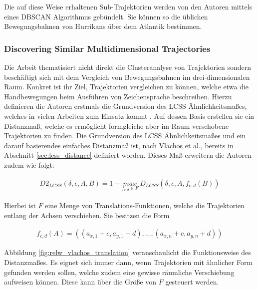 Die auf diese Weise erhaltenen Sub-Trajektorien werden von den Autoren mittels eines DBSCAN Algorithmus gebündelt.
Sie können so die üblichen Bewegungsbahnen von Hurrikans über dem Atlantik bestimmen.


\subsubsection*{Discovering Similar Multidimensional Trajectories}
Die Arbeit \cite[]{Vlachos2002} thematisiert nicht direkt die Clusteranalyse von Trajektorien sondern
beschäftigt sich mit dem Vergleich von Bewegungsbahnen im drei-dimensionalen Raum. Konkret ist ihr Ziel,
Trajektorien vergleichen zu können, welche etwa die Handbewegungen beim Ausführen von Zeichensprache beschreiben.
Hierzu definieren die Autoren erstmals die Grundversion des LCSS Ähnlichkeitsmaßes, welches in vielen Arbeiten zum Einsatz
kommt \cite[]{Atev2006, Buzan2004, Chen2005}. Auf dessen Basis erstellen sie ein Distanzmaß, welche es ermöglicht
formgleiche aber im Raum verschobene Trajektorien zu finden.
Die Grundversion des LCSS Ähnlichkeitsmaßes und ein darauf basierendes einfaches Distanzmaß ist, nach Vlachos et al.,
bereits in Abschnitt \ref{sec:lcss_distance} definiert worden.
Dieses Maß erweitern die Autoren zudem wie folgt:

\begin{ceqn}
\begin{align}
    D2_{LCSS}(\delta, \epsilon, A, B) = 1 - \underset{f_{c,d} \in F}{max}\ D_{LCSS}(\delta, \epsilon, A, f_{c,d}(B))
\end{align}
\end{ceqn}

Hierbei ist $F$ eine Menge von Translations-Funktionen, welche die Trajektorien entlang der Achsen verschieben.
Sie besitzen die Form

\begin{ceqn}
\begin{align}
    f_{c, d}(A) = ((a_{x, 1} + c, a_{y, 1} + d), ..., (a_{x, n} + c, a_{y, n} + d))
\end{align}
\end{ceqn}

Abbildung \ref{fig:relw_vlachos_translation} veranschaulicht die Funktionsweise des Distanzmaßes. Es eignet sich immer dann, wenn Trajektorien
mit ähnlicher Form gefunden werden sollen, welche zudem eine gewisse räumliche Verschiebung aufweisen können.
Diese kann über die Größe von $F$ gesteuert werden.

